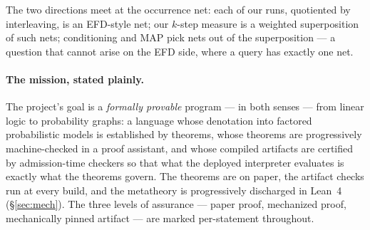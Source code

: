 \documentclass[11pt]{article}
\theoremstyle{plain}
\theoremstyle{definition}
\theoremstyle{remark}
\begin{document}
The two directions meet at the occurrence net: each of our runs,
quotiented by interleaving, is an EFD-style net; our $k$-step measure is
a weighted superposition of such nets; conditioning and MAP pick nets out
of the superposition --- a question that cannot arise on the EFD side,
where a query has exactly one net.

\paragraph{The mission, stated plainly.} The project's goal is a
\emph{formally provable} program --- in both senses --- from linear logic
to probability graphs: a language whose denotation into factored
probabilistic models is established by theorems, whose theorems are
progressively machine-checked in a proof assistant, and whose compiled
artifacts are certified by admission-time checkers so that what the
deployed interpreter evaluates is exactly what the theorems govern.
The theorems are on paper, the artifact checks run at every build, and
the metatheory is progressively discharged in Lean~4
(\S\ref{sec:mech}). The three levels of assurance --- paper proof,
mechanized proof, mechanically pinned artifact --- are marked
per-statement throughout.
\end{document}
